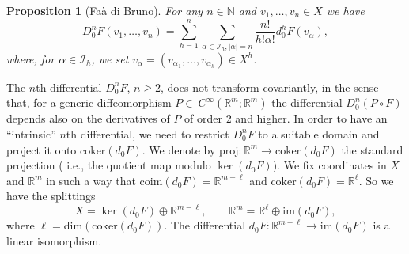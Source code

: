 \documentclass[12pt, reqno]{amsart}
\theoremstyle{plain}
\newtheorem {proposition} [theorem]{Proposition}
\theoremstyle{definition}
\theoremstyle{remark}
\numberwithin{equation}{section}
\newcommand{\R}{\mathbb{R}}
\newcommand{\N}{\mathbb{N}}
\renewcommand{\phi}{\varphi}
\newcommand{\0}{\theta}
\renewcommand{\a}{\alpha}
\newcommand{\1}{{-1}}
\renewcommand{\l}{\ell}
\renewcommand{\=}{\coloneqq}
\renewcommand{\.}{\dots}
\newcommand{\proj}{\mathrm{proj}}
\newcommand{\coker}{\mathrm{coker}}
\newcommand{\coim}{\mathrm{coim}}
\begin{document}
 
%	


\begin{proposition}[Fa\`a di Bruno]
%
 For any $n\in\N$ and $v_1,\dots,v_n\in X$ we have 
 \begin{equation}\label{FdB}
 D_0^n F(v_1,\dots, v_n)=\sum_{h=1}^n\sum_{\a\in \mathscr I_h, |\a|=n}\frac{n!}{h!\a!}d_0^hF(v_\a),
 \end{equation}
 where, for $\a\in \mathscr I_h$, we set $v_\a=(v_{\a_1},\dots, v_{\a_h})\in X^h$.
\end{proposition}



The $n$th differential $D^n_0F$, $n\geq 2$,  does not transform covariantly, in the sense that, for a generic diffeomorphism $P\in\ C^\infty(\R^m;\R^m)$ the differential $D^n_0(P\circ F)$ depends also on the derivatives of $P$ of order $2$ and higher. In order to have an ``intrinsic'' $n$th differential, we need to restrict $D_0^nF$ to a suitable domain and project it onto $\coker(d_0F)$.
We denote  by $\proj:\R^m\to \coker(d_0F)$ the standard projection ({\color{black} i.e., the quotient map modulo $\ker(d_0F)$}).
We fix coordinates in $X$ and $\R^m$ in such a way that $\coim(d_0F) =\R^{m-\ell}$ and $\coker (d_0F) = \R^\l$.
So we have
 the   splittings
\begin{equation}
\label{SPLIT}
X = \ker(d_0 F) \oplus \R^{m-\ell},\qquad
\R^m = \R^{\l}\oplus \mathrm{im}(d_0 F), 
\end{equation}
where $\l=\mathrm{dim}(\coker(d_0 F))$. The differential  $d_0 F:  \R^{m-\ell}\to \mathrm{im}(d_0 F)$ is a linear isomorphism.
\end{document}
